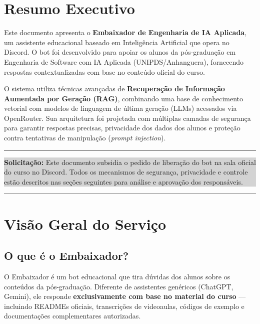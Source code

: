 \documentclass[11pt,a4paper]{article}
\newcommand{\boxedinfo}[1]{%
  \vspace{0.8em}\noindent
  {\color{primary!20}\rule{\textwidth}{0.5pt}}\par\nopagebreak
  \vspace{0.3em}\noindent\colorbox{lightgray}{%
    \parbox{\dimexpr\textwidth-2\fboxsep\relax}{%
      \vspace{0.4em}\hspace{0.5em}#1\hspace{0.5em}\vspace{0.4em}%
    }%
  }\par\nopagebreak
  \vspace{0.3em}\noindent
  {\color{primary!20}\rule{\textwidth}{0.5pt}}\vspace{0.8em}%
}
\begin{document}
\newpage
\pagestyle{plain}
\tableofcontents
\newpage
\pagestyle{main}

\section{Resumo Executivo}

Este documento apresenta o \textbf{Embaixador de Engenharia de IA Aplicada}, um assistente educacional baseado em Inteligência Artificial que opera no Discord. O bot foi desenvolvido para apoiar os alunos da pós-graduação em Engenharia de Software com IA Aplicada (UNIPDS/Anhanguera), fornecendo respostas contextualizadas com base no conteúdo oficial do curso.

O sistema utiliza técnicas avançadas de \textbf{Recuperação de Informação Aumentada por Geração (RAG)}, combinando uma base de conhecimento vetorial com modelos de linguagem de última geração (LLMs) acessados via OpenRouter. Sua arquitetura foi projetada com múltiplas camadas de segurança para garantir respostas precisas, privacidade dos dados dos alunos e proteção contra tentativas de manipulação (\textit{prompt injection}).

\boxedinfo{\textbf{Solicitação:} Este documento subsidia o pedido de liberação do bot na sala oficial do curso no Discord. Todos os mecanismos de segurança, privacidade e controle estão descritos nas seções seguintes para análise e aprovação dos responsáveis.}

\section{Visão Geral do Serviço}

\subsection{O que é o Embaixador?}

O Embaixador é um bot educacional que tira dúvidas dos alunos sobre os conteúdos da pós-graduação. Diferente de assistentes genéricos (ChatGPT, Gemini), ele responde \textbf{exclusivamente com base no material do curso} — incluindo READMEs oficiais, transcrições de videoaulas, códigos de exemplo e documentações complementares autorizadas.
\end{document}
